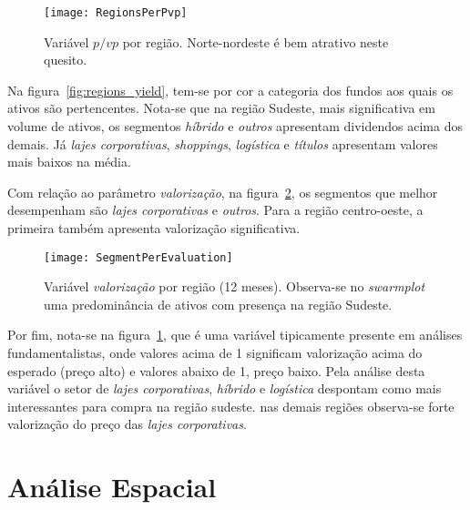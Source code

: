 \begin{center}
\begin{figure}
\begin{centering}
\texttt{[image: RegionsPerPvp]}
\end{centering}
\caption{\label{fig:regions_pvp}Variável $p/vp$ por região. Norte-nordeste é bem atrativo neste quesito.}
\end{figure}
\vspace*{-44pt}
\end{center}

Na figura~\ref{fig:regions_yield}, tem-se por cor a categoria dos fundos aos quais os ativos são pertencentes. Nota-se que na região Sudeste, mais significativa em volume de ativos, os segmentos \emph{híbrido} e \emph{outros} apresentam dividendos acima dos demais. Já \emph{lajes corporativas}, \emph{shoppings}, \emph{logística} e \emph{títulos} apresentam valores mais baixos na média. 

Com relação ao parâmetro \emph{valorização}, na figura~\ref{fig:regions_evaluation}, os segmentos que melhor desempenham são \emph{lajes corporativas} e \emph{outros}. Para a região centro-oeste, a primeira também apresenta valorização significativa.

\begin{center}
\begin{figure}
\begin{centering}
\texttt{[image: SegmentPerEvaluation]}
\end{centering}
\caption{\label{fig:regions_evaluation}Variável \emph{valorização} por região (12 meses). Observa-se no \emph{swarmplot} uma predominância de ativos com presença na região Sudeste.}
\end{figure}
\vspace*{-44pt}
\end{center}

Por fim, nota-se na figura~\ref{fig:regions_pvp}, que é uma variável tipicamente presente em análises fundamentalistas, onde valores acima de 1 significam valorização acima do esperado (preço alto) e valores abaixo de 1, preço baixo. Pela análise desta variável o setor de \emph{lajes corporativas}, \emph{híbrido} e \emph{logística} despontam como mais interessantes para compra na região sudeste. nas demais regiões observa-se forte valorização do preço das \emph{lajes corporativas}.

\section{Análise Espacial}
\label{sec:spatial_analysis_br}

